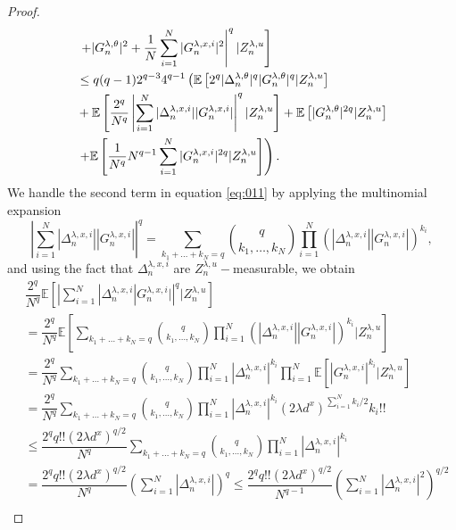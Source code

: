\documentclass[a4paper, 10pt]{article}
\theoremstyle{plain}%
\begin{document}
\begin{proof}
\begin{align}
&\left.\left.+|G_n^{\lambda,\theta}|^2+\dfrac{1}{N}\sum_{i=1}^N|G_n^{\lambda,x,i}|^2\right|^q|Z_n^{\lambda,u} \right]\notag\\
&\leq q(q-1)2^{q-3}4^{q-1}\left(\mathbb{E}\left[2^q|\Delta_n^{\lambda,\theta}|^q|G_n^{\lambda,\theta}|^q|Z_n^{\lambda,u}\right]\right.\notag\\
&+\mathbb{E}\left[\dfrac{2^q}{N^q} \left|\sum_{i=1}^N |\Delta_n^{\lambda,x,i}||G_n^{\lambda,x,i}|\right|^q|Z_n^{\lambda,u}\right]+\mathbb{E}\left[|G_n^{\lambda,\theta}|^{2q}|Z_n^{\lambda,u}\right]\notag\\
&\left.+\mathbb{E}\left[\dfrac{1}{N^q}N^{q-1}\sum_{i=1}^N|G_n^{\lambda,x,i}|^{2q}|Z_n^{\lambda,u}\right]\right).\label{eq:011}
\end{align}
We handle the second term in equation \eqref{eq:011} by applying the multinomial expansion
$$\left|\sum_{i=1}^N |\Delta_n^{\lambda,x,i}||G_n^{\lambda,x,i}|\right|^q=\sum_{k_1+\ldots+k_N=q}\binom{q}{k_1,\ldots,k_N}\prod_{i=1}^N\left(|\Delta_n^{\lambda,x,i}||G_n^{\lambda,x,i}|\right)^{k_i},$$
and using the fact that $\Delta_n^{\lambda,x,i}$ are $Z_n^{\lambda,u}-$measurable, we obtain
\begin{align*}
&\dfrac{2^q}{N^q}\mathbb{E}\left[\left|\sum_{i=1}^N |\Delta_n^{\lambda,x,i}|G_n^{\lambda,x,i}|\right|^q|Z_n^{\lambda,u}\right]\\
&= \dfrac{2^q}{N^q}\mathbb{E}\left[\sum_{k_1+\ldots+k_N=q}\binom{q}{k_1,\ldots,k_N}\prod_{i=1}^N\left(|\Delta_n^{\lambda,x,i}||G_n^{\lambda,x,i}|\right)^{k_i}|Z_n^{\lambda,u}\right]\\
&=\dfrac{2^q}{N^q}\sum_{k_1+\ldots+k_N=q}\binom{q}{k_1,\ldots,k_N}\prod_{i=1}^N |\Delta_n^{\lambda,x,i}|^{k_i}\prod_{i=1}^N\mathbb{E}\left[|G_n^{\lambda,x,i}|^{k_i}|Z_n^{\lambda,u}\right]\\
&=\dfrac{2^q}{N^q}\sum_{k_1+\ldots+k_N=q}\binom{q}{k_1,\ldots,k_N}\prod_{i=1}^N |\Delta_n^{\lambda,x,i}|^{k_i}(2\lambda d^x)^{\sum_{i=1}^Nk_i/2}k_i!!\\
&\leq \dfrac{2^q q!!(2\lambda d^x)^{q/2}}{N^q}\sum_{k_1+\ldots+k_N=q}\binom{q}{k_1,\ldots,k_N}\prod_{i=1}^N |\Delta_n^{\lambda,x,i}|^{k_i}\\
&=\dfrac{2^q q!!(2\lambda d^x)^{q/2}}{N^q}\left(\sum_{i=1}^N |\Delta_n^{\lambda,x,i}|\right)^q\leq \dfrac{2^q q!!(2\lambda d^x)^{q/2}}{N^{q-1}}\left(\sum_{i=1}^N |\Delta_n^{\lambda,x,i}|^2\right)^{q/2}\\

\end{align*}
\end{proof}
\end{document}

